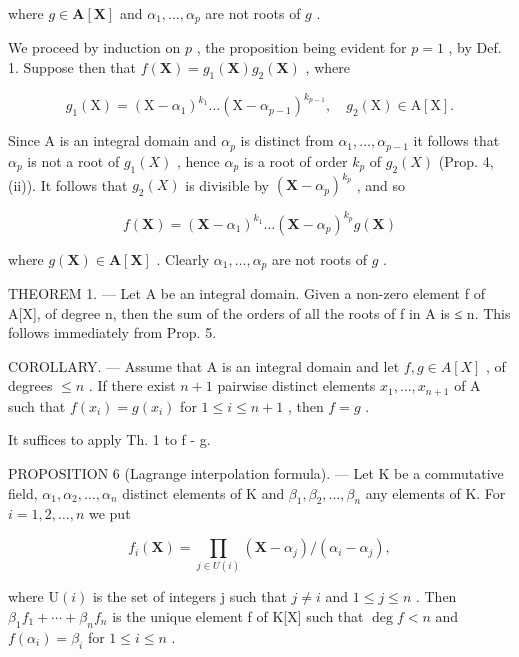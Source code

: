where \(g \in \mathbf{A}[\mathbf{X}]\) and \(\alpha_1, \ldots, \alpha_p\) are not roots of \(g\) .

We proceed by induction on \(p\) , the proposition being evident for \(p = 1\) , by Def. 1. Suppose then that \(f(\mathbf{X}) = g_1(\mathbf{X})g_2(\mathbf{X})\) , where

\[
g _ {1} (\mathrm{X}) = \left(\mathrm{X} - \alpha_ {1}\right) ^ {k _ {1}} \dots \left(\mathrm{X} - \alpha_ {p - 1}\right) ^ {k _ {p - 1}}, \quad g _ {2} (\mathrm{X}) \in \mathrm{A} [ \mathrm{X} ].
\]

Since A is an integral domain and \(\alpha_{p}\) is distinct from \(\alpha_{1},\ldots,\alpha_{p-1}\) it follows that \(\alpha_{p}\) is not a root of \(g_{1}(X)\) , hence \(\alpha_{p}\) is a root of order \(k_{p}\) of \(g_{2}(X)\) (Prop. 4, (ii)). It follows that \(g_{2}(X)\) is divisible by \((\mathbf{X}-\alpha_{p})^{k_{p}}\) , and so

\[
f (\mathbf {X}) = \left(\mathbf {X} - \alpha_ {1}\right) ^ {k _ {1}} \dots \left(\mathbf {X} - \alpha_ {p}\right) ^ {k _ {p}} g (\mathbf {X})
\]

where \(g(\mathbf{X}) \in \mathbf{A}[\mathbf{X}]\) . Clearly \(\alpha_1, \ldots, \alpha_p\) are not roots of \(g\) .

THEOREM 1. --- Let A be an integral domain. Given a non-zero element f of A{[}X{]}, of degree n, then the sum of the orders of all the roots of f in A is ≤ n. This follows immediately from Prop. 5.

COROLLARY. --- Assume that A is an integral domain and let \(f, g \in A[X]\) , of degrees \(\leqslant n\) . If there exist \(n+1\) pairwise distinct elements \(x_{1}, \ldots, x_{n+1}\) of A such that \(f(x_{i}) = g(x_{i})\) for \(1 \leqslant i \leqslant n+1\) , then \(f = g\) .

It suffices to apply Th. 1 to f - g.

PROPOSITION 6 (Lagrange interpolation formula). --- Let K be a commutative field, \(\alpha_{1}, \alpha_{2}, \ldots, \alpha_{n}\) distinct elements of K and \(\beta_{1}, \beta_{2}, \ldots, \beta_{n}\) any elements of K. For \(i = 1, 2, \ldots, n\) we put

\[
f _ {i} (\mathbf {X}) = \prod_ {j \in U (i)} \left(\mathbf {X} - \alpha_ {j}\right) / \left(\alpha_ {i} - \alpha_ {j}\right),
\]

where \(\mathrm{U}(i)\) is the set of integers j such that \(j \neq i\) and \(1 \leqslant j \leqslant n\) . Then \(\beta_{1}f_{1} + \cdots + \beta_{n}f_{n}\) is the unique element f of K{[}X{]} such that \(\deg f < n\) and \(f(\alpha_{i}) = \beta_{i}\) for \(1 \leqslant i \leqslant n\) .

